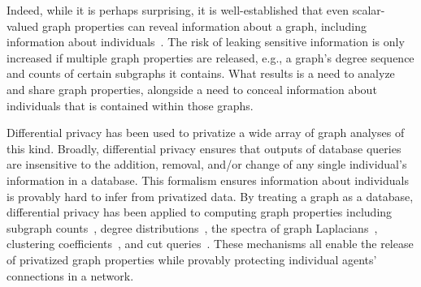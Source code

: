 \documentclass[conference]{ieeeconf}
\begin{document}

Indeed, while it is perhaps surprising, it is well-established that even scalar-valued
graph properties can reveal information about a graph, including information
about individuals~\cite{ding2018privacy, sun2019analyzing, day2016publishing, chen2021edge, hawkins2023node, hay2009accurate, gupta2012iterative, wang2013learning, nguyen2016detecting, proserpio2014calibrating}.
The risk of leaking sensitive information is only increased if multiple graph properties are released, e.g.,
a graph's degree sequence and counts of certain subgraphs it contains.
What results is a need to analyze and share graph properties, alongside a need
to conceal information about individuals that is contained within those graphs. 



Differential privacy has been used to privatize a wide array of graph analyses of this kind.
Broadly, differential privacy ensures that outputs of database queries are insensitive to the addition, removal, 
and/or change
of any single individual's information in a database. 
This formalism ensures information about individuals is provably
hard to infer from privatized data. 
By treating a graph as a database, 
differential privacy has been applied
to computing graph properties including subgraph counts~\cite{sun2019analyzing, ding2018privacy, blocki2013differentially, kasiviswanathan2013analyzing}, degree distributions~\cite{day2016publishing}, the spectra of graph Laplacians~\cite{chen21,hawkins2023node, chen2024bounded}, clustering coefficients~\cite{wang2013learning}, and cut queries~\cite{gupta2012iterative}.
These mechanisms all enable the release of privatized graph properties while provably protecting individual agents' connections
in a network. 
\end{document}
